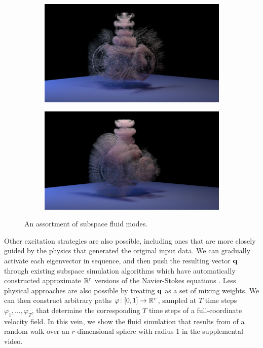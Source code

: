 \documentclass[11pt]{article}
\begin{document}
\begin{figure}
\begin{subfigure}[h]{0.5\textwidth}
	\end{subfigure}
	\begin{subfigure}[h]{0.5\textwidth}
		\centering
		\includegraphics[width=\textwidth]{Figures/modes/plume0006.png}		
	\end{subfigure}
	\begin{subfigure}[h]{0.5\textwidth}
		\centering
		\includegraphics[width=\textwidth]{Figures/modes/plume0007.png}		
	\end{subfigure}
	\caption{An assortment of subspace fluid modes.}
	\label{fig:eigs}
\end{figure}

Other excitation strategies are also possible, including ones that are more closely guided by the physics that generated the original input data. We can gradually activate each eigenvector in sequence, and then push the resulting vector $\mathbf{q}$ through existing subspace simulation algorithms which have automatically constructed approximate $\mathbb{R}^r$ versions of the Navier-Stokes equations \cite{Kim2013}. Less physical approaches are also possible by treating $\mathbf{q}$ as a set of mixing weights. We can then construct arbitrary paths $\varphi \colon [0, 1] \rightarrow \mathbb{R}^r$, sampled at $T$ time steps $\varphi_1, \ldots, \varphi_T$, that determine the corresponding $T$ time steps of a full-coordinate velocity field. In this vein, we show the fluid simulation that results from of a random walk over an $r$-dimensional sphere with radius 1 in the supplemental video. 
\end{document}

